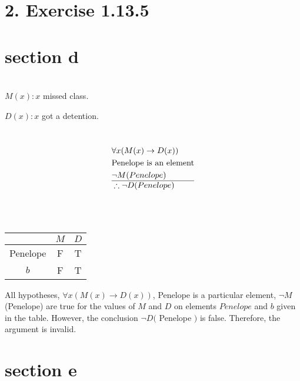 \documentclass[10pt]{article}
\begin{document}
\section*{2. Exercise 1.13.5}
\section*{section d}

\\

{$M(x): x$ missed class.}

{$D(x): x$ got a detention.}

\\

$$
\begin{aligned}
& \forall x(M(x) \rightarrow D(x))\\
& \text{Penelope is an element} \\
& \neg M (Penelope) \\
\hline
& \therefore \neg D (Penelope) \\
\end{aligned}
$$

 \\

 \\

\begin{center}
\begin{tabular}{|c|c|c|}
\hline
 & $M$ & $D$ \\
\hline
Penelope & F & T \\
\hline
$b$ & F & T \\
\hline
\end{tabular}
\end{center}

All hypotheses, $\forall x(M(x) \rightarrow D(x))$, Penelope is a particular element, $\neg M$ (Penelope) are true for the values of $M$ and $D$ on elements $Penelope$ and $b$ given in the table. However, the conclusion $\neg D($ Penelope $)$ is false. Therefore, the argument is invalid.

\section*{section e}

\\
\end{document}
